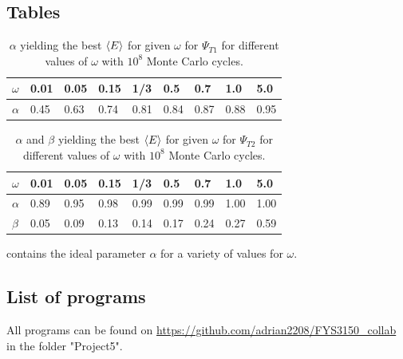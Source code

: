 \documentclass[10pt,a4paper]{article}
\begin{document}
\subsection{Tables}
\begin{table}[H]
\centering
\caption[$\alpha$ yielding the best $\braket{E}$ for given $\omega$]{$\alpha$ yielding the best $\braket{E}$ for given $\omega$ for $\Psi_{T1}$ for different values of $\omega$ with $10^8$ Monte Carlo cycles. }
\begin{tabular}{|l|l|l|l|l|l|l|l|l|}
\hline
$\omega$ & 0.01 & 0.05 & 0.15 & 1/3  & 0.5  & 0.7  & 1.0  & 5.0  \\ \hline
$\alpha$ & 0.45 & 0.63 & 0.74 & 0.81 & 0.84 & 0.87 & 0.88 & 0.95 \\ \hline
\end{tabular}\label{Table5}
\end{table}
\begin{table}[H]
\centering
\caption[$\alpha$ and $\beta$ yielding the best $\braket{E}$ for given $\omega$]{$\alpha$ and $\beta$ yielding the best $\braket{E}$ for given $\omega$ for $\Psi_{T2}$ for different values of $\omega$ with $10^8$ Monte Carlo cycles. }
\begin{tabular}{|l|l|l|l|l|l|l|l|l|}
\hline
$\omega$ & 0.01 & 0.05 & 0.15 & 1/3  & 0.5  & 0.7  & 1.0  & 5.0  \\ \hline
$\alpha$ & 0.89 & 0.95 & 0.98 & 0.99 & 0.99 & 0.99 & 1.00 & 1.00 \\ \hline
$\beta$ & 0.05 & 0.09 & 0.13 & 0.14 & 0.17 & 0.24 & 0.27 & 0.59 \\ \hline

\end{tabular} contains the ideal parameter $\alpha$ for a variety of values for $\omega$.
\end{table}

\subsection{List of programs}\label{Listofprograms}
All programs can be found on \url{https://github.com/adrian2208/FYS3150_collab} in the folder "Project5".
\end{document}
